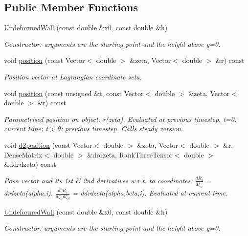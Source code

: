 \subsection*{Public Member Functions}
\begin{DoxyCompactItemize}
\item 
\hyperlink{classUndeformedWall_ad09cfdcd234be0ab47eb97a8a470602a}{Undeformed\+Wall} (const double \&x0, const double \&h)
\begin{DoxyCompactList}\small\item\em Constructor\+: arguments are the starting point and the height above y=0. \end{DoxyCompactList}\item 
void \hyperlink{classUndeformedWall_ab0410681e2096091319a79e79937cba3}{position} (const Vector$<$ double $>$ \&zeta, Vector$<$ double $>$ \&r) const
\begin{DoxyCompactList}\small\item\em Position vector at Lagrangian coordinate zeta. \end{DoxyCompactList}\item 
void \hyperlink{classUndeformedWall_a9cbb52e30fd47d1841c1c3dc812f4b96}{position} (const unsigned \&t, const Vector$<$ double $>$ \&zeta, Vector$<$ double $>$ \&r) const
\begin{DoxyCompactList}\small\item\em Parametrised position on object\+: r(zeta). Evaluated at previous timestep. t=0\+: current time; t$>$0\+: previous timestep. Calls steady version. \end{DoxyCompactList}\item 
void \hyperlink{classUndeformedWall_a6e25add1790f0de89bbe6840dae66a93}{d2position} (const Vector$<$ double $>$ \&zeta, Vector$<$ double $>$ \&r, Dense\+Matrix$<$ double $>$ \&drdzeta, Rank\+Three\+Tensor$<$ double $>$ \&ddrdzeta) const
\begin{DoxyCompactList}\small\item\em Posn vector and its 1st \& 2nd derivatives w.\+r.\+t. to coordinates\+: $ \frac{dR_i}{d \zeta_\alpha}$ = drdzeta(alpha,i). $ \frac{d^2R_i}{d \zeta_\alpha d \zeta_\beta}$ = ddrdzeta(alpha,beta,i). Evaluated at current time. \end{DoxyCompactList}\item 
\hyperlink{classUndeformedWall_ad09cfdcd234be0ab47eb97a8a470602a}{Undeformed\+Wall} (const double \&x0, const double \&h)
\begin{DoxyCompactList}\small\item\em Constructor\+: arguments are the starting point and the height above y=0. \end{DoxyCompactList}\item 

\end{DoxyCompactItemize}

